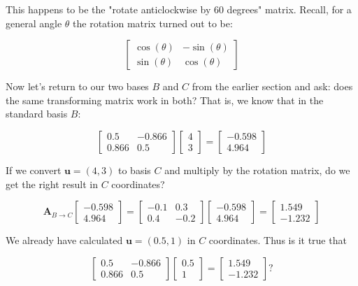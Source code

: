 \documentclass[main.tex]{subfiles}
\begin{document}
    This happens to be the "rotate anticlockwise by 60 degrees" matrix. Recall, for a general angle $\theta$ the rotation matrix turned out to be: 
    
    $$
    \left[\begin{array}{cc}
    \cos (\theta) & -\sin (\theta) \\
    \sin (\theta) & \cos (\theta)
    \end{array}\right]
    $$
    
    Now let's return to our two bases $B$ and $C$ from the earlier section and ask: does the same transforming matrix work in both? That is, we know that in the standard basis $B$:
    
    $$
    \left[\begin{array}{cc}
    0.5 & -0.866 \\
    0.866 & 0.5
    \end{array}\right]\left[\begin{array}{l}
    4 \\
    3
    \end{array}\right]=\left[\begin{array}{r}
    -0.598 \\
    4.964
    \end{array}\right]
    $$
    
    If we convert $\mathbf{u}=(4,3)$ to basis $C$ and multiply by the rotation matrix, do we get the right result in $C$ coordinates?
    
    $$
    \mathbf{A}_{B \rightarrow C}\left[\begin{array}{r}
    -0.598 \\
    4.964
    \end{array}\right]=\left[\begin{array}{cc}
    -0.1 & 0.3 \\
    0.4 & -0.2
    \end{array}\right]\left[\begin{array}{r}
    -0.598 \\
    4.964
    \end{array}\right]=\left[\begin{array}{r}
    1.549 \\
    -1.232
    \end{array}\right]
    $$
    
    We already have calculated $\mathbf{u}=(0.5,1)$ in $C$ coordinates. Thus is it true that 
    
    $$
    \left[\begin{array}{cc}
    0.5 & -0.866 \\
    0.866 & 0.5
    \end{array}\right]\left[\begin{array}{r}
    0.5 \\
    1
    \end{array}\right]=\left[\begin{array}{r}
    1.549 \\
    -1.232
    \end{array}\right] ?
    $$
    
\end{document}
